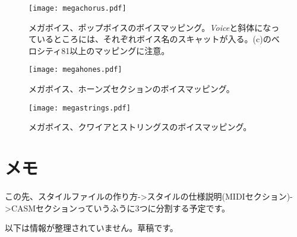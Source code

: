 \documentclass[uplatex, 10pt, dvipdfmx]{jsarticle}
\numberwithin{equation}{section}
\begin{document}
\begin{figure}[h]
  \centering
  \texttt{[image: megachorus.pdf]}
  \caption{メガボイス、ポップボイスのボイスマッピング。\textit{Voice}と斜体になっているところには、それぞれボイス名のスキャットが入る。(c)のベロシティ81以上のマッピングに注意。}
\end{figure}
\clearpage
{}
\begin{figure}[h]
  \centering
  \texttt{[image: megahones.pdf]}
  \caption{メガボイス、ホーンズセクションのボイスマッピング。}
\end{figure}
\clearpage
{}
\begin{figure}[h]
  \centering
  \texttt{[image: megastrings.pdf]}
  \caption{メガボイス、クワイアとストリングスのボイスマッピング。}
  \label{figmegaend}
\end{figure}
\clearpage

\section{メモ}
この先、スタイルファイルの作り方->スタイルの仕様説明(MIDIセクション)->CASMセクションっていうふうに3つに分割する予定です。

以下は情報が整理されていません。草稿です。

\clearpage
\end{document}
